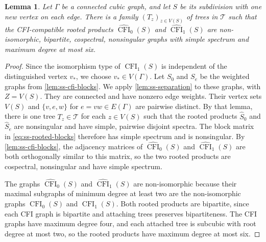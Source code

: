 \documentclass[11pt,a4paper]{article}
\theoremstyle{plain}
\newtheorem{lemma}[theorem]{Lemma}
\theoremstyle{definition}
\DeclareMathOperator{\CFI}{CFI}
\begin{document}
\begin{lemma}\label{lem:ss-cfi-spectrum}
Let $\Gamma$ be a connected cubic graph, and let $S$ be its subdivision
with one new vertex on each edge.
There is a family $(T_z)_{z\in V(S)}$ of trees in $\mathcal T$ such that the
CFI-compatible rooted products $\widehat{\CFI}_0(S)$ and $\widehat{\CFI}_1(S)$
are non-isomorphic, bipartite, cospectral, nonsingular graphs with
simple spectrum and maximum degree at most six.
\end{lemma}
\begin{proof}
Since the isomorphism type of $\CFI_1(S)$ is independent of the
distinguished vertex $v_*$, we choose $v_*\in V(\Gamma)$.
Let $S_0$ and $S_e$ be the weighted graphs from \cref{lem:ss-cfi-blocks}.
We apply \cref{lem:ss-separation} to these graphs,
with $Z=V(S)$.
They are connected and have nonzero edge weights. Their vertex sets
$V(S)$ and $\{v,e,w\}$ for $e=vw\in E(\Gamma)$ are pairwise distinct.
By that lemma, there is one tree $T_z\in\mathcal T$ for each
$z\in V(S)$ such that the rooted products $\widehat S_0$ and
$\widehat S_e$ are nonsingular and have simple, pairwise disjoint
spectra.
The block matrix in \cref{eq:ss-rooted-blocks} therefore has simple
spectrum and is nonsingular.
By \cref{lem:ss-cfi-blocks}, the adjacency matrices of
$\widehat{\CFI}_0(S)$ and $\widehat{\CFI}_1(S)$ are both
orthogonally similar to this matrix, so the two rooted products are
cospectral, nonsingular and have simple spectrum.

The graphs $\widehat{\CFI}_0(S)$ and $\widehat{\CFI}_1(S)$ are
non-isomorphic because their maximal subgraphs of minimum degree at least two
are the non-isomorphic graphs $\CFI_0(S)$ and $\CFI_1(S)$.
Both rooted products are bipartite, since each CFI graph is bipartite
and attaching trees preserves bipartiteness.
The CFI graphs have maximum degree four, and each attached tree is
subcubic with root degree at most two, so the rooted products have
maximum degree at most six.
\end{proof}
\end{document}
